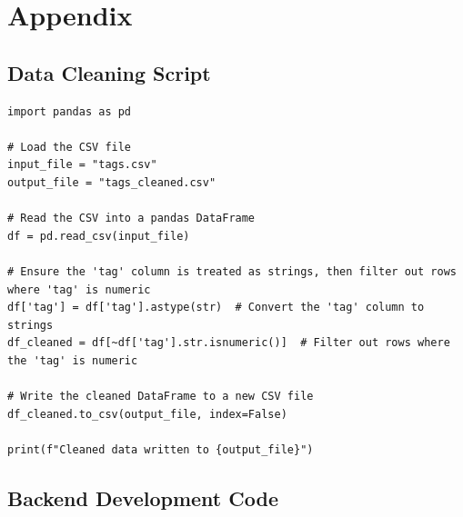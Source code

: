 \documentclass[conference]{IEEEtran}
\begin{document}
\section*{Appendix}

\subsection{Data Cleaning Script}
\begin{lstlisting}
import pandas as pd

# Load the CSV file
input_file = "tags.csv"
output_file = "tags_cleaned.csv"

# Read the CSV into a pandas DataFrame
df = pd.read_csv(input_file)

# Ensure the 'tag' column is treated as strings, then filter out rows where 'tag' is numeric
df['tag'] = df['tag'].astype(str)  # Convert the 'tag' column to strings
df_cleaned = df[~df['tag'].str.isnumeric()]  # Filter out rows where the 'tag' is numeric

# Write the cleaned DataFrame to a new CSV file
df_cleaned.to_csv(output_file, index=False)

print(f"Cleaned data written to {output_file}")
\end{lstlisting}

\subsection{Backend Development Code}
\end{document}
